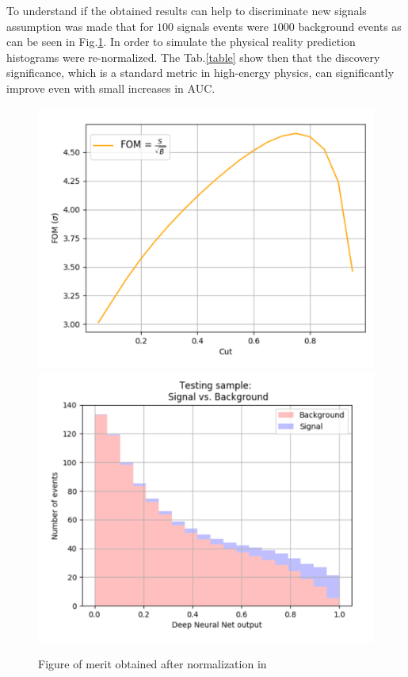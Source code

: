 To understand if the obtained results can help to discriminate new signals
assumption was made that for $100$ signals events were $1000$ background
events as can be seen in Fig.\ref{res}. In order to simulate the physical
reality prediction histograms were re-normalized. The Tab.\ref{table} show
then that the discovery significance, which is a standard metric in
high-energy physics, can significantly improve even with small increases in
AUC.

\begin{figure}[hb]
 \centering
 \includegraphics[width=.45\textwidth]{figures/fomr.png}
 \includegraphics[width=.45\textwidth]{figures/svdbr.png}
 \caption{Figure of merit obtained after normalization in~\cite{gaia}}
 \label{res}
\end{figure}

